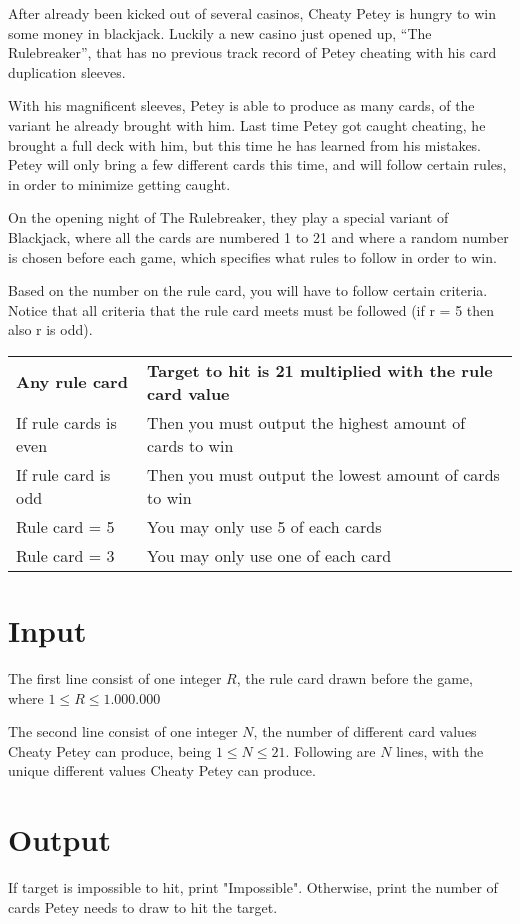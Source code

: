 
After already been kicked out of several casinos, Cheaty Petey is hungry to win some money in blackjack. Luckily a new casino just opened up, “The Rulebreaker”, that has no previous track record of Petey cheating with his card duplication sleeves.

With his magnificent sleeves, Petey is able to produce as many cards, of the variant he already brought with him. Last time Petey got caught cheating, he brought a full deck with him, but this time he has learned from his mistakes. Petey will only bring a few different cards this time, and will follow certain rules, in order to minimize getting caught.

On the opening night of The Rulebreaker, they play a special variant of Blackjack, where all the cards are numbered 1 to 21 and where a random number is chosen before each game, which specifies what rules to follow in order to win. 

Based on the number on the rule card, you will have to follow certain criteria. Notice that all criteria that the rule card meets must be followed (if r = 5 then also r is odd). 

\begin{tabular}{ll}
\textbf{Any rule card} & \textbf{Target to hit is 21 multiplied with the rule card value} \\
If rule cards is even & Then you must output the highest amount of cards to win  \\
If rule card is odd   & Then you must output the lowest amount of cards to win \\
Rule card = 5         & You may only use 5 of each cards                        \\
Rule card = 3         & You may only use one of each card                      
\end{tabular}


\section*{Input}
The first line consist of one integer $R$, the rule card drawn before the game, where 
$1\leq R \leq 1.000.000$



The second line consist of one integer $N$, the number of different card values Cheaty Petey can produce, being $1\leq N \leq 21$. Following are $N$ lines, with the unique different values Cheaty Petey can produce.

\section*{Output}
If target is impossible to hit, print "Impossible". Otherwise, print the number of cards Petey needs to draw to hit the target.
